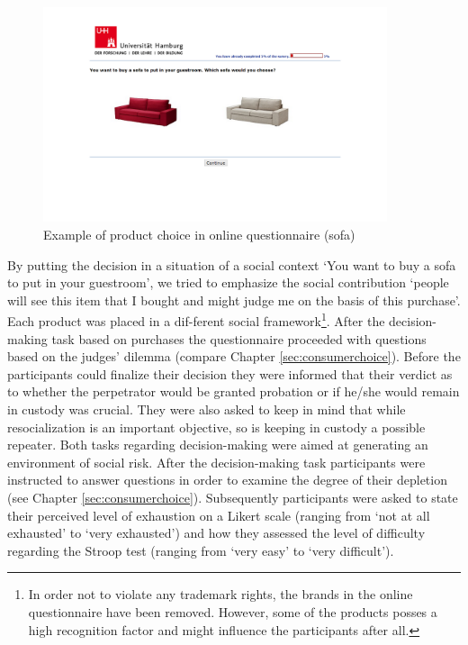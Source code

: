 \begin{figure}[h!]
\center
	\includegraphics[trim= 0pt 8cm 0pt 2cm, clip=true,width=0.9\textwidth]{images/os_product_choice.png}
  \caption{Example of product choice in online questionnaire (sofa)}\label{fig:os_product_choice}
\end{figure}
By putting the decision in a situation of a social context ‘You want to buy a sofa to put in your guestroom’, we tried to emphasize the social contribution ‘people will see this item that I bought and might judge me on the basis of this purchase’. Each product was placed in a dif-ferent social framework\footnote{In order not to violate any trademark rights, the brands in the online questionnaire have been removed. However, some of the products posses a high recognition factor and might influence the participants after all.}. After the decision-making task based on purchases the questionnaire proceeded with questions based on the judges’ dilemma (compare Chapter \ref{sec:consumerchoice}). Before the participants could finalize their decision they were informed that their verdict as to whether the perpetrator would be granted probation or if he/she would remain in custody was crucial. They were also asked to keep in mind that while resocialization is an important objective, so is keeping in custody a possible repeater. Both tasks regarding decision-making were aimed at generating an environment of social risk. After the decision-making task participants were instructed to answer questions in order to examine the degree of their depletion (see Chapter \ref{sec:consumerchoice}). Subsequently participants were asked to state their perceived level of exhaustion on a Likert scale (ranging from ‘not at all exhausted’ to ‘very exhausted’) and how they assessed the level of difficulty regarding the Stroop test (ranging from ‘very easy’ to ‘very difficult’).\par

